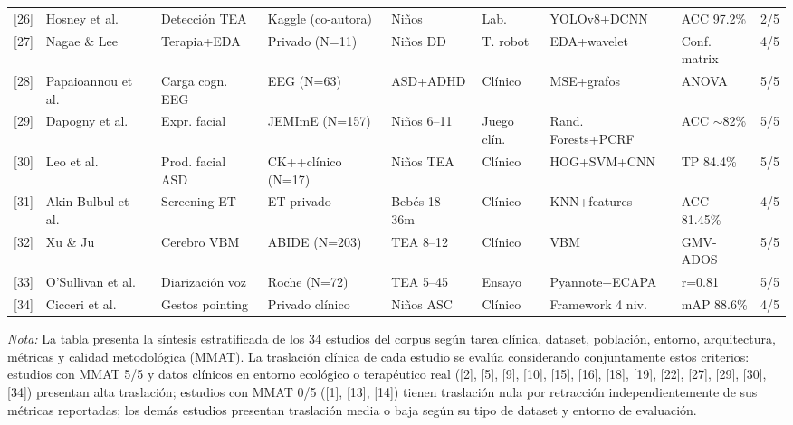\documentclass[ASNA,twocolumn]{USG}
\begin{document}
\begin{table}[!t]
{\begin{tabular*}{\textwidth}{@{\extracolsep\fill}clllllllc@{\extracolsep\fill}}
				{[26]} & Hosney et al.\      & Detección TEA       & Kaggle (co-autora) & Niños           & Lab.       & YOLOv8+DCNN           & ACC 97.2\%     & 2/5 \\
				{[27]} & Nagae \& Lee        & Terapia+EDA         & Privado (N=11)     & Niños DD        & T. robot   & EDA+wavelet           & Conf. matrix   & 4/5 \\
				{[28]} & Papaioannou et al.\ & Carga cogn. EEG     & EEG (N=63)         & ASD+ADHD & Clínico    & MSE+grafos            & ANOVA          & 5/5 \\
				{[29]} & Dapogny et al.\     & Expr. facial        & JEMImE (N=157)     & Niños 6--11     & Juego clín.& Rand. Forests+PCRF    & ACC $\sim$82\% & 5/5 \\
				{[30]} & Leo et al.\         & Prod. facial ASD    & CK++clínico (N=17) & Niños TEA       & Clínico    & HOG+SVM+CNN           & TP 84.4\%      & 5/5 \\
				{[31]} & Akin-Bulbul et al.\ & Screening ET        & ET privado         & Bebés 18--36m   & Clínico    & KNN+features          & ACC 81.45\%    & 4/5 \\
				{[32]} & Xu \& Ju            & Cerebro VBM         & ABIDE (N=203)      & TEA 8--12       & Clínico    & VBM                   & GMV-ADOS       & 5/5 \\
				{[33]} & O'Sullivan et al.\  & Diarización voz     & Roche (N=72)       & TEA 5--45       & Ensayo     & Pyannote+ECAPA        & r=0.81         & 5/5 \\
				{[34]} & Cicceri et al.\     & Gestos pointing     & Privado clínico    & Niños ASC       & Clínico    & Framework 4 niv.      & mAP 88.6\%     & 4/5 \\
				\bottomrule
		\end{tabular*}}
		\begin{tablenotes}
			\item {\it Nota:} La tabla presenta la síntesis estratificada de los 34 estudios
			del corpus según tarea clínica, dataset, población, entorno, arquitectura, métricas
			y calidad metodológica (MMAT). La traslación clínica de cada estudio se evalúa
			considerando conjuntamente estos criterios: estudios con MMAT 5/5 y datos clínicos
			en entorno ecológico o terapéutico real ([2], [5], [9], [10], [15], [16], [18],
			[19], [22], [27], [29], [30], [34]) presentan alta traslación; estudios con MMAT
			0/5 ([1], [13], [14]) tienen traslación nula por retracción independientemente de
			sus métricas reportadas; los demás estudios presentan traslación media o baja según
			su tipo de dataset y entorno de evaluación.
		\end{tablenotes}
	\end{table}
	
\end{document}
